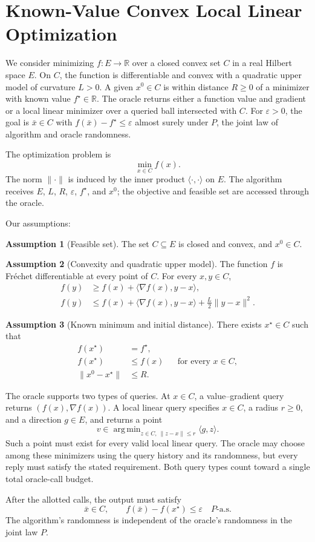 \documentclass[10pt]{article}
\theoremstyle{definition}
\newtheorem{assumption}{Assumption}
\begin{document}
\section*{Known-Value Convex Local Linear Optimization}
We consider minimizing $f:E\to\mathbb{R}$ over a closed convex set $C$ in a real Hilbert space $E$. On $C$, the function is differentiable and convex with a quadratic upper model of curvature $L>0$. A given $x^0\in C$ is within distance $R\geq0$ of a minimizer with known value $f^\star\in\mathbb{R}$. The oracle returns either a function value and gradient or a local linear minimizer over a queried ball intersected with $C$. For $\varepsilon>0$, the goal is $\bar{x}\in C$ with $f(\bar{x})-f^\star\leq\varepsilon$ almost surely under $P$, the joint law of algorithm and oracle randomness.

The optimization problem is
\[
\min_{x\in C} f(x).
\]
The norm $\|\cdot\|$ is induced by the inner product $\langle\cdot,\cdot\rangle$ on $E$. The algorithm receives $E$, $L$, $R$, $\varepsilon$, $f^\star$, and $x^0$; the objective and feasible set are accessed through the oracle.

Our assumptions:
\begin{assumption}[Feasible set]
The set $C\subseteq E$ is closed and convex, and $x^0\in C$.
\end{assumption}

\begin{assumption}[Convexity and quadratic upper model]
The function $f$ is Fr\'echet differentiable at every point of $C$. For every $x,y\in C$,
\[
\begin{aligned}
f(y)&\geq f(x)+\langle\nabla f(x),y-x\rangle,\\
f(y)&\leq f(x)+\langle\nabla f(x),y-x\rangle
             +\frac{L}{2}\|y-x\|^2.
\end{aligned}
\]
\end{assumption}

\begin{assumption}[Known minimum and initial distance]
There exists $x^\star\in C$ such that
\[
\begin{aligned}
f(x^\star)&=f^\star,\\
f(x^\star)&\leq f(x) &&\text{for every }x\in C,\\
\|x^0-x^\star\|&\leq R.
\end{aligned}
\]
\end{assumption}

The oracle supports two types of queries. At $x\in C$, a value--gradient query returns $(f(x),\nabla f(x))$. A local linear query specifies $x\in C$, a radius $r\geq0$, and a direction $g\in E$, and returns a point
\[
v\in\mathop{\mathrm{arg\,min}}_{z\in C,\ \|z-x\|\leq r}
\langle g,z\rangle.
\]
Such a point must exist for every valid local linear query. The oracle may choose among these minimizers using the query history and its randomness, but every reply must satisfy the stated requirement. Both query types count toward a single total oracle-call budget.

After the allotted calls, the output must satisfy
\[
\bar{x}\in C,
\qquad f(\bar{x})-f(x^\star)\leq\varepsilon
\quad P\text{-a.s.}
\]
The algorithm's randomness is independent of the oracle's randomness in the joint law $P$.
\end{document}
